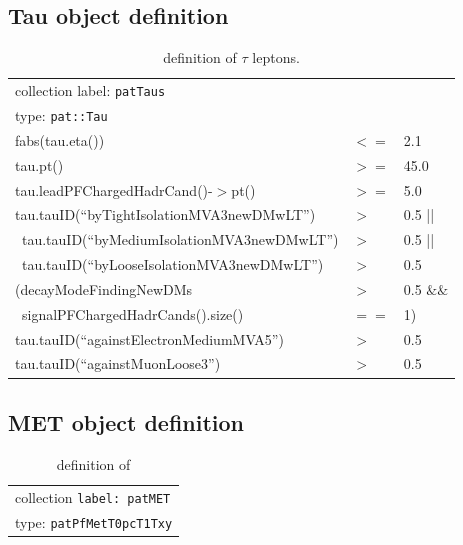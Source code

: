 \subsection{Tau object definition}

\begin{table}[htb]
  \caption{definition of \ensuremath{\tau} leptons.}
  \label{table:tauobjdefinition}
  \begin{center}
  \ttfamily\scriptsize\selectfont
  \begin{tabular}{|l|ll|}
    \hline
    \multicolumn{3}{|l|}{ collection label: \texttt{patTaus}}\\
    \multicolumn{3}{|l|}{ type: \texttt{pat::Tau}}\\
    \hline
    fabs(tau.eta()) & $<=$ & 2.1 \\
    tau.pt() & $>=$ & 45.0 \\
    tau.leadPFChargedHadrCand()-$>$pt() & $>=$ & 5.0 \\
    tau.tauID(``byTightIsolationMVA3newDMwLT'') & $>$ & 0.5 ||\\
    ~tau.tauID(``byMediumIsolationMVA3newDMwLT'') & $>$ & 0.5 ||\\
    ~tau.tauID(``byLooseIsolationMVA3newDMwLT'') & $>$ & 0.5 \\
    (decayModeFindingNewDMs & $>$ & 0.5 $\&\&$ \\ 
    ~signalPFChargedHadrCands().size() & $==$ & 1) \\
    tau.tauID(``againstElectronMediumMVA5'') & $>$ & 0.5 \\
    tau.tauID(``againstMuonLoose3'') & $>$ & 0.5 \\
    \hline
  \end{tabular}
  \end{center}
\end{table}

\clearpage

\subsection{MET object definition}

\begin{table}[htb]
  \caption{definition of \met}
  \label{table:metobjdefinition}
  \ttfamily\scriptsize\selectfont
  \begin{center}
   \begin{tabular}{|l|ll|}
      \hline
      \multicolumn{3}{|l|}{ collection \texttt{label: patMET}}\\
      \multicolumn{3}{|l|}{ type: \texttt{patPfMetT0pcT1Txy}}\\
      \hline
    \end{tabular}
  \end{center}
\end{table}

